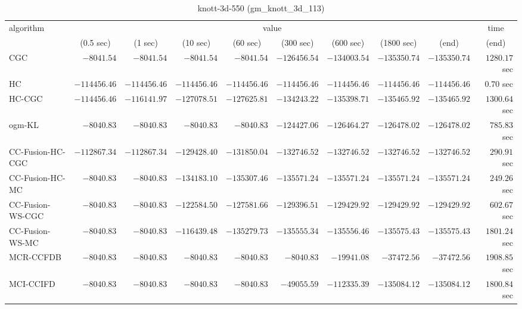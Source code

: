\begin{table}[H]
\scriptsize
\centering
\caption{knott-3d-550 (gm\_knott\_3d\_113)}
\label{tab:anytimetable-knott-3d-550-gm-knott-3d-113}
\begin{tabular}{lrrrrrrrrr}
\toprule
           algorithm &                                   \multicolumn{8}{c}{value} & \multicolumn{1}{c}{time}   \\  
\cmidrule(lr){2-9}\cmidrule(lr){10-10}   
                     & \multicolumn{1}{c}{(0.5 sec)} & \multicolumn{1}{c}{(1 sec)} & \multicolumn{1}{c}{(10 sec)} & \multicolumn{1}{c}{(60 sec)} & \multicolumn{1}{c}{(300 sec)} & \multicolumn{1}{c}{(600 sec)} & \multicolumn{1}{c}{(1800 sec)} & \multicolumn{1}{c}{(end)} & \multicolumn{1}{c}{(end)}   \\ \midrule 
                 CGC & $     -8041.54$ & $     -8041.54$ & $     -8041.54$ & $     -8041.54$ & $   -126456.54$ & $   -134003.54$ & $   -135350.74$ & $   -135350.74$ & $      1280.17$ sec   \\ 
                  HC & $   -114456.46$ & $   -114456.46$ & $   -114456.46$ & $   -114456.46$ & $   -114456.46$ & $   -114456.46$ & $   -114456.46$ & $   -114456.46$ & $         0.70$ sec   \\ 
              HC-CGC & $   -114456.46$ & $   -116141.97$ & $   -127078.51$ & $   -127625.81$ & $   -134243.22$ & $   -135398.71$ & $   -135465.92$ & $   -135465.92$ & $      1300.64$ sec   \\ 
              ogm-KL & $     -8040.83$ & $     -8040.83$ & $     -8040.83$ & $     -8040.83$ & $   -124427.06$ & $   -126464.27$ & $   -126478.02$ & $   -126478.02$ & $       785.83$ sec   \\ 
    CC-Fusion-HC-CGC & $   -112867.34$ & $   -112867.34$ & $   -129428.40$ & $   -131850.04$ & $   -132746.52$ & $   -132746.52$ & $   -132746.52$ & $   -132746.52$ & $       290.91$ sec   \\ 
     CC-Fusion-HC-MC & $     -8040.83$ & $     -8040.83$ & $   -134183.10$ & $   -135307.46$ & $   -135571.24$ & $   -135571.24$ & $   -135571.24$ & $   -135571.24$ & $       249.26$ sec   \\ 
    CC-Fusion-WS-CGC & $     -8040.83$ & $     -8040.83$ & $   -122584.50$ & $   -127581.66$ & $   -129396.51$ & $   -129429.92$ & $   -129429.92$ & $   -129429.92$ & $       602.67$ sec   \\ 
     CC-Fusion-WS-MC & $     -8040.83$ & $     -8040.83$ & $   -116439.48$ & $   -135279.73$ & $   -135555.34$ & $   -135556.46$ & $   -135575.43$ & $   -135575.43$ & $      1801.24$ sec   \\ 
\cmidrule{1-1} 
           MCR-CCFDB & $     -8040.83$ & $     -8040.83$ & $     -8040.83$ & $     -8040.83$ & $     -8040.83$ & $    -19941.08$ & $    -37472.56$ & $    -37472.56$ & $      1908.85$ sec   \\ 
\cmidrule{1-1} 
           MCI-CCIFD & $     -8040.83$ & $     -8040.83$ & $     -8040.83$ & $     -8040.83$ & $    -49055.59$ & $   -112335.39$ & $   -135084.12$ & $   -135084.12$ & $      1800.84$ sec   \\ 
\bottomrule
\end{tabular}
\end{table}


